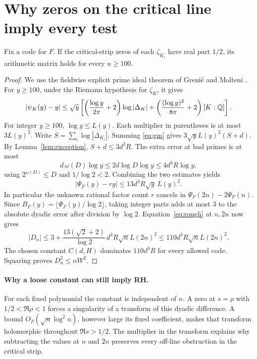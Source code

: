\documentclass[11pt]{article}
\begin{document}
\section{Why zeros on the critical line imply every test}\label{sec:forward}
\begin{proposition}\label{prop:forward}
Fix a code for \(F\). If the critical-strip zeros of each \(\zeta_{K_i}\) have real part \(1/2\), its arithmetic matrix holds for every \(n\ge100\).
\end{proposition}
\begin{proof}
We use the fieldwise explicit prime ideal theorem of Greni\'e and Molteni \cite[Corollary 1.2]{gm}. For \(y\ge100\), under the Riemann hypothesis for \(\zeta_K\), it gives
\begin{equation}\label{eq:gm}
|\psi_K(y)-y|\le \sqrt y\left[
 \left(\frac{\log y}{2\pi}+2\right)\log|\Delta_K|
 +\left(\frac{(\log y)^2}{8\pi}+2\right)[K:\mathbb Q]\right].
\end{equation}
For integer \(y\ge100\), \(\log y\le L(y)\). Each multiplier in parentheses is at most \(3L(y)^2\). Write \(S=\sum_i\log|\Delta_{K_i}|\). Summing \eqref{eq:gm} gives \(3\sqrt y L(y)^2(S+d)\). By Lemma~\ref{lem:exception}, \(S+d\le3d^2R\). The extra error at bad primes is at most
\[
 d\,\omega(D)\log y\le 2d\log D\log y\le 4d^3R\log y,
\]
using \(2^{\omega(D)}\le D\) and \(1/\log 2<2\). Combining the two estimates yields
\begin{equation}\label{eq:rough}
             |\Psi_F(y)-ry|\le 13d^3R\sqrt y\,L(y)^2 .
\end{equation}
In particular the unknown rational factor count \(r\) cancels in
\(\Psi_F(2n)-2\Psi_F(n)\). Since \(B_F(y)=\lfloor\Psi_F(y)/\log 2\rfloor\), taking integer parts adds at most \(3\) to the absolute dyadic error after division by \(\log 2\). Equation~\eqref{eq:rough} at \(n,2n\) now gives
\[
 |D_n|\le 3+
 \frac{13(\sqrt2+2)}{\log2}\, d^3R\sqrt n L(2n)^2
 \le 110d^3R\sqrt n L(2n)^2 .
\]
The chosen constant \(C(d,H)\) dominates \(110d^3R\) for every allowed code. Squaring proves \(D_n^2\le nW^2\).
\end{proof}

\paragraph{Why a loose constant can still imply RH.}
For each fixed polynomial the constant is independent of \(n\). A zero at \(s=\rho\) with \(1/2<\Re\rho<1\) forces a singularity of a transform of this dyadic difference. A bound \(O_F(\sqrt n\log^2 n)\), however large its fixed coefficient, makes that transform holomorphic throughout \(\Re s>1/2\). The multiplier in the transform explains why subtracting the values at \(n\) and \(2n\) preserves every off-line obstruction in the critical strip.
\newpage
\end{document}
